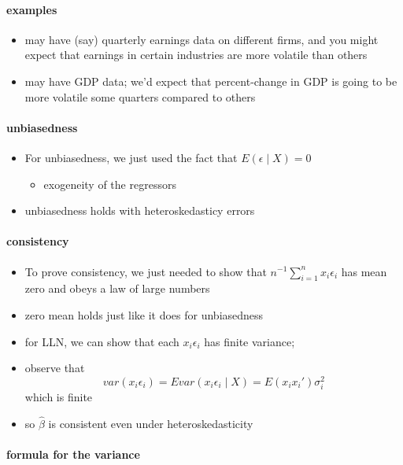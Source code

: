 \paragraph{examples}
\label{sec-1-1-1}

\begin{itemize}
\item may have (say) quarterly earnings data on different firms, and
        you might expect that earnings in certain industries are more
        volatile than others
\item may have GDP data; we'd expect that percent-change in GDP is
        going to be more volatile some quarters compared to others
\end{itemize}
\paragraph{unbiasedness}
\label{sec-1-1-2}

\begin{itemize}
\item For unbiasedness, we just used the fact that $E(\epsilon \mid
        X) = 0$
\begin{itemize}
\item exogeneity of the regressors
\end{itemize}
\item unbiasedness holds with heteroskedasticy errors
\end{itemize}
\paragraph{consistency}
\label{sec-1-1-3}

\begin{itemize}
\item To prove consistency, we just needed to show that
        $n^{-1}\sum_{i=1}^n x_i \epsilon_i$ has mean zero and obeys a
        law of large numbers
\item zero mean holds just like it does for unbiasedness
\item for LLN, we can show that each $x_i \epsilon_i$ has finite
        variance;
\item observe that
        \[var(x_i \epsilon_i) = E var(x_i \epsilon_i \mid X) = E(x_i
        x_i') \sigma_i^2\]
        which is finite
\item so $\hat\beta$ is consistent even under heteroskedasticity
\end{itemize}
\paragraph{formula for the variance}
\label{sec-1-1-4}

